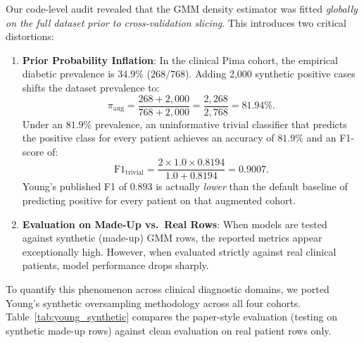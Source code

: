 \documentclass[journal,twocolumn]{IEEEtran}
\begin{document}
Our code-level audit revealed that the GMM density estimator was fitted \emph{globally on the full dataset prior to cross-validation slicing}. This introduces two critical distortions:
\begin{enumerate}
    \item \textbf{Prior Probability Inflation}: In the clinical Pima cohort, the empirical diabetic prevalence is $34.9\%$ ($268/768$). Adding 2,000 synthetic positive cases shifts the dataset prevalence to:
    \begin{equation}
    \pi_{\text{aug}} = \frac{268 + 2{,}000}{768 + 2{,}000} = \frac{2{,}268}{2{,}768} = 81.94\%.
    \end{equation}
    Under an $81.9\%$ prevalence, an uninformative trivial classifier that predicts the positive class for every patient achieves an accuracy of $81.9\%$ and an F1-score of:
    \begin{equation}
    \text{F1}_{\text{trivial}} = \frac{2 \times 1.0 \times 0.8194}{1.0 + 0.8194} = 0.9007.
    \end{equation}
    Young's published F1 of $0.893$ is actually \emph{lower} than the default baseline of predicting positive for every patient on that augmented cohort.
    \item \textbf{Evaluation on Made-Up vs.\ Real Rows}: When models are tested against synthetic (made-up) GMM rows, the reported metrics appear exceptionally high. However, when evaluated strictly against real clinical patients, model performance drops sharply.
\end{enumerate}

To quantify this phenomenon across clinical diagnostic domains, we ported Young's synthetic oversampling methodology across all four cohorts. Table~\ref{tab:young_synthetic} compares the paper-style evaluation (testing on synthetic made-up rows) against clean evaluation on real patient rows only.
\end{document}
